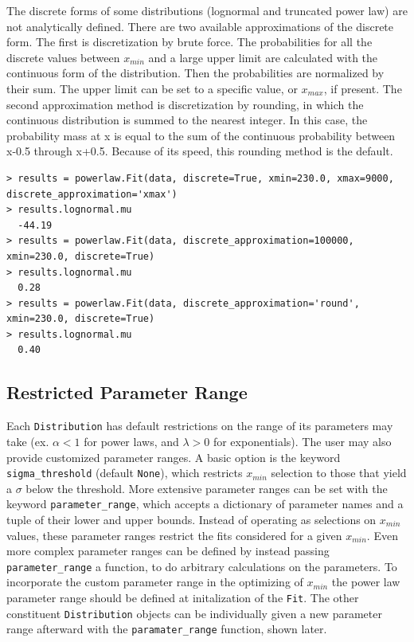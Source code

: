 \documentclass[10pt]{article}
\begin{document}
The discrete forms of some distributions (lognormal and truncated power law) are not analytically defined. There are two available approximations of the discrete form. The first is discretization by brute force. The probabilities for all the discrete values between $x_{min}$ and a large upper limit are calculated with the continuous form of the distribution. Then the probabilities are normalized by their sum. The upper limit can be set to a specific value, or $x_{max}$, if present. The second approximation method is discretization by rounding, in which the continuous distribution is summed to the nearest integer. In this case, the probability mass at x is equal to the sum of the continuous probability between x-0.5 through x+0.5. Because of its speed, this rounding method is the default.

\begin{verbatim}
> results = powerlaw.Fit(data, discrete=True, xmin=230.0, xmax=9000, discrete_approximation='xmax')
> results.lognormal.mu
  -44.19
> results = powerlaw.Fit(data, discrete_approximation=100000, xmin=230.0, discrete=True)
> results.lognormal.mu
  0.28
> results = powerlaw.Fit(data, discrete_approximation='round', xmin=230.0, discrete=True)
> results.lognormal.mu
  0.40
\end{verbatim}


\subsection*{Restricted Parameter Range}\label{FittingMethodology}
Each \verb$Distribution$ has default restrictions on the range of its parameters may take (ex. $\alpha < 1$ for power laws, and $\lambda > 0$ for exponentials). The user may also provide customized parameter ranges. A basic option is the keyword \verb$sigma_threshold$ (default \verb$None$), which restricts $x_{min}$ selection to those that yield a $\sigma$ below the threshold. More extensive parameter ranges can be set with the keyword \verb$parameter_range$, which accepts a dictionary of parameter names and a tuple of their lower and upper bounds. Instead of operating as selections on $x_{min}$ values, these parameter ranges restrict the fits considered for a given $x_{min}$. Even more complex parameter ranges can be defined by instead passing \verb$parameter_range$ a function, to do arbitrary calculations on the parameters. To incorporate the custom parameter range in the optimizing of $x_{min}$ the power law parameter range should be defined at initalization of the \verb$Fit$.  The other constituent \verb"Distribution" objects can be individually given a new parameter range afterward with the \verb$paramater_range$ function, shown later. 
\end{document}
